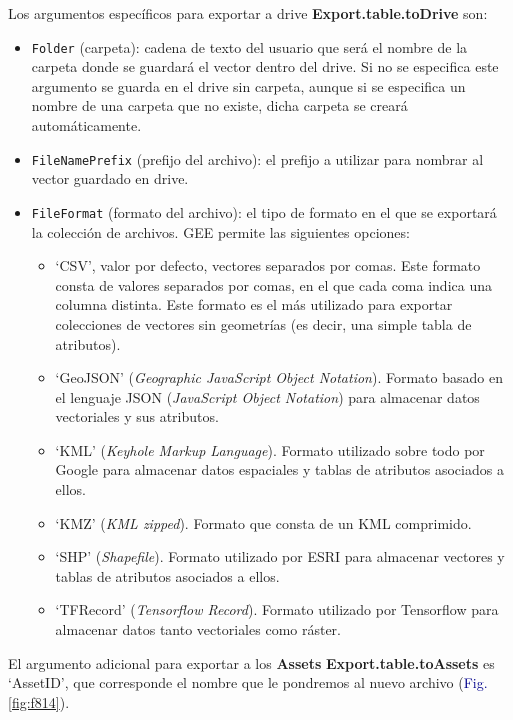 \documentclass[
  12pt,
  letterpaper,
  twoside]{book}
\providecommand{\tightlist}{%
  \setlength{\itemsep}{0pt}\setlength{\parskip}{0pt}}
\newcommand\boldpurple[1]{\textcolor{darkpurple}{\textbf{#1}}}
\begin{document}
Los argumentos específicos para exportar a drive \boldpurple{Export.table.toDrive} son:

\begin{itemize}
\item
  \texttt{Folder} (carpeta): cadena de texto del usuario que será el nombre de la carpeta donde se guardará el vector dentro del drive. Si no se especifica este argumento se guarda en el drive sin carpeta, aunque si se especifica un nombre de una carpeta que no existe, dicha carpeta se creará automáticamente.
\item
  \texttt{FileNamePrefix} (prefijo del archivo): el prefijo a utilizar para nombrar al vector guardado en drive.
\item
  \texttt{FileFormat} (formato del archivo): el tipo de formato en el que se exportará la colección de archivos. GEE permite las siguientes opciones:

  \begin{itemize}
  \tightlist
  \item
    `CSV', valor por defecto, vectores separados por comas. Este formato consta de valores separados por comas, en el que cada coma indica una columna distinta. Este formato es el más utilizado para exportar colecciones de vectores sin geometrías (es decir, una simple tabla de atributos).
  \item
    `GeoJSON' (\emph{Geographic JavaScript Object Notation}). Formato basado en el lenguaje JSON (\emph{JavaScript Object Notation}) para almacenar datos vectoriales y sus atributos.
  \item
    `KML' (\emph{Keyhole Markup Language}). Formato utilizado sobre todo por Google para almacenar datos espaciales y tablas de atributos asociados a ellos.
  \item
    `KMZ' (\emph{KML zipped}). Formato que consta de un KML comprimido.
  \item
    `SHP' (\emph{Shapefile}). Formato utilizado por ESRI para almacenar vectores y tablas de atributos asociados a ellos.
  \item
    `TFRecord' (\emph{Tensorflow Record}). Formato utilizado por Tensorflow para almacenar datos tanto vectoriales como ráster.
  \end{itemize}
\end{itemize}

El argumento adicional para exportar a los \textbf{Assets} \boldpurple{Export.table.toAssets} es `AssetID', que corresponde el nombre que le pondremos al nuevo archivo (\textcolor{darkblue}{Fig.} \ref{fig:f814}).
\end{document}
